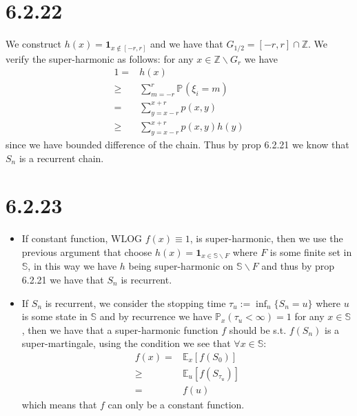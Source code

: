 \documentclass[11pt,a4paper]{ctexart}
\numberwithin{equation}{section}%
\begin{document}
\section{6.2.22}



We construct $ h(x)=\mathbf{1}_{x\not\in [-r,r]} $ and we have that $ G_{1/2} = [-r,r]\cap \mathbb{Z} $. We verify the super-harmonic as follows: for any $ x\in \mathbb{Z}\backslash G_r $ we have
\begin{align*}
    1=& h(x)\\
    \geq& \sum_{m=-r}^{r}\mathbb{P}_{  }\left( \xi _i = m \right) \\
    =&\sum_{y=x-r}^{x+r}p(x,y)\\
    \geq& \sum_{y=x-r}^{x+r}p(x,y)h(y)
\end{align*}
since we have bounded difference of the chain. Thus by prop 6.2.21 we know that $ S_n $ is a recurrent chain.



\section{6.2.23}


\begin{itemize}[topsep=2pt,itemsep=0pt]
    \item If constant function, WLOG $ f(x)\equiv 1 $, is super-harmonic, then we use the previous argument that choose $ h(x)=\mathbf{1}_{x\in \mathbb{S}\backslash F} $ where $ F $ is some finite set in $ \mathbb{S} $, in this way we have $ h $ being super-harmonic on $ \mathbb{S}\backslash F $ and thus by prop 6.2.21 we have that $ S_n $ is recurrent.
    \item If $ S_n $ is recurrent, we consider the stopping time $ \tau_u:= \inf_n\{S_n = u\} $ where $ u $ is some state in $ \mathbb{S} $ and by recurrence we have $ \mathbb{P}_{ x }\left( \tau_u <\infty \right) =1 $ for any $ x\in \mathbb{S} $, then we have that a super-harmonic function $ f $ should be s.t. $ f(S_n) $ is a super-martingale, using the condition we see that $ \forall x\in \mathbb{S} $:
    \begin{align*}
        f(x)=&\mathbb{E}_{ x }\left[ f(S_0) \right]\\
        \geq& \mathbb{E}_{ u }\left[ f(S_{\tau_u}) \right]\\
        =& f(u)
    \end{align*}
    which means that $ f $ can only be a constant function.
\end{itemize}

    













    

    
\end{document}
